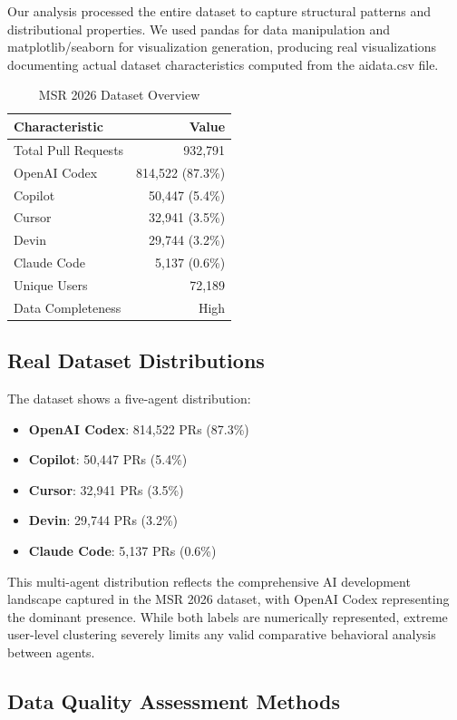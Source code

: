 \documentclass[conference]{IEEEtran}
\begin{document}
Our analysis processed the entire dataset to capture structural patterns and distributional properties. We used pandas for data manipulation and matplotlib/seaborn for visualization generation, producing real visualizations documenting actual dataset characteristics computed from the aidata.csv file.

\begin{table}[t]
\centering
\caption{MSR 2026 Dataset Overview}
\label{tab:dataset_overview}
\begin{tabular}{@{}lr@{}}
\toprule
\textbf{Characteristic} & \textbf{Value} \\
\midrule
Total Pull Requests & 932,791 \\
OpenAI Codex & 814,522 (87.3\%) \\
Copilot & 50,447 (5.4\%) \\
Cursor & 32,941 (3.5\%) \\
Devin & 29,744 (3.2\%) \\
Claude Code & 5,137 (0.6\%) \\
Unique Users & 72,189 \\
Data Completeness & High \\
\bottomrule
\end{tabular}
\end{table}

\subsection{Real Dataset Distributions}

The dataset shows a five-agent distribution:
\begin{itemize}
    \item \textbf{OpenAI Codex}: 814,522 PRs (87.3\%)
    \item \textbf{Copilot}: 50,447 PRs (5.4\%)
    \item \textbf{Cursor}: 32,941 PRs (3.5\%)
    \item \textbf{Devin}: 29,744 PRs (3.2\%)
    \item \textbf{Claude Code}: 5,137 PRs (0.6\%)
\end{itemize}

This multi-agent distribution reflects the comprehensive AI development landscape captured in the MSR 2026 dataset, with OpenAI Codex representing the dominant presence. While both labels are numerically represented, extreme user-level clustering severely limits any valid comparative behavioral analysis between agents.

\subsection{Data Quality Assessment Methods}
\end{document}
